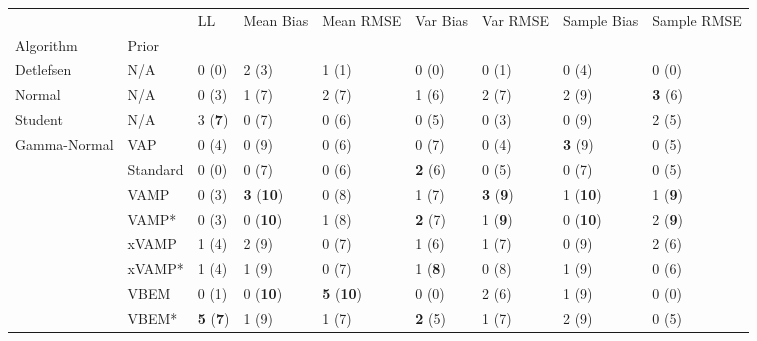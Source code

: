 \begin{tabular}{lllllllll}
\toprule
             &       &                       LL &                 Mean Bias &                 Mean RMSE &        Var Bias &                 Var RMSE &      Sample Bias &     Sample RMSE \\
Algorithm & Prior &                          &                           &                           &                 &                          &                  &                 \\
\midrule
Detlefsen & N/A &                    0 (0) &                     2 (3) &                     1 (1) &           0 (0) &                    0 (1) &            0 (4) &           0 (0) \\
Normal & N/A &                    0 (3) &                     1 (7) &                     2 (7) &           1 (6) &                    2 (7) &            2 (9) &  \textbf{3} (6) \\
Student & N/A &           3 (\textbf{7}) &                     0 (7) &                     0 (6) &           0 (5) &                    0 (3) &            0 (9) &           2 (5) \\
Gamma-Normal & VAP &                    0 (4) &                     0 (9) &                     0 (6) &           0 (7) &                    0 (4) &   \textbf{3} (9) &           0 (5) \\
             & Standard &                    0 (0) &                     0 (7) &                     0 (6) &  \textbf{2} (6) &                    0 (5) &            0 (7) &           0 (5) \\
             & VAMP &                    0 (3) &  \textbf{3} (\textbf{10}) &                     0 (8) &           1 (7) &  \textbf{3} (\textbf{9}) &  1 (\textbf{10}) &  1 (\textbf{9}) \\
             & VAMP* &                    0 (3) &           0 (\textbf{10}) &                     1 (8) &  \textbf{2} (7) &           1 (\textbf{9}) &  0 (\textbf{10}) &  2 (\textbf{9}) \\
             & xVAMP &                    1 (4) &                     2 (9) &                     0 (7) &           1 (6) &                    1 (7) &            0 (9) &           2 (6) \\
             & xVAMP* &                    1 (4) &                     1 (9) &                     0 (7) &  1 (\textbf{8}) &                    0 (8) &            1 (9) &           0 (6) \\
             & VBEM &                    0 (1) &           0 (\textbf{10}) &  \textbf{5} (\textbf{10}) &           0 (0) &                    2 (6) &            1 (9) &           0 (0) \\
             & VBEM* &  \textbf{5} (\textbf{7}) &                     1 (9) &                     1 (7) &  \textbf{2} (5) &                    1 (7) &            2 (9) &           0 (5) \\
\bottomrule
\end{tabular}

